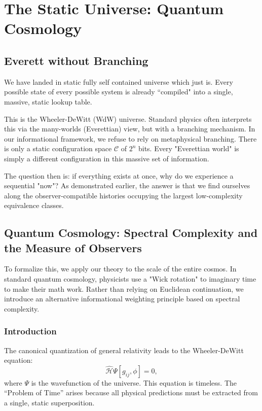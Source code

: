 \chapter{The Static Universe: Quantum Cosmology}
\label{chap:wdw}

\section{Everett without Branching}

We have landed in static fully self contained universe which just is. Every possible state of every possible system is already ``compiled" into a single, massive, static lookup table.

This is the Wheeler-DeWitt (WdW) universe. Standard physics often interprets this via the many-worlds (Everettian) view, but with a branching mechanism.
In our informational framework, we refuse to rely on metaphysical branching. There is only a static configuration space $\mathcal{C}$ of $2^n$ bits. Every "Everettian world" is simply a different
configuration in this massive set of information.

The question then is: if everything exists at once, why do we experience a sequential "now"?
As demonstrated earlier, the answer is that we find ourselves along the observer-compatible histories occupying the largest low-complexity equivalence classes.


\section{Quantum Cosmology: Spectral Complexity and the Measure of Observers}

To formalize this, we apply our theory to the scale of the entire cosmos.
In standard quantum cosmology, physicists use a "Wick rotation" to imaginary time to make their math work. 
Rather than relying on Euclidean continuation, we introduce an alternative informational weighting principle based on spectral complexity.


\subsection*{Introduction}

The canonical quantization of general relativity leads to the Wheeler-DeWitt equation:
\begin{equation}
\hat{\mathcal{H}} \Psi[g_{ij}, \phi] = 0,
\end{equation}
where $\Psi$ is the wavefunction of the universe. This equation is timeless. The ``Problem of Time'' arises because all physical predictions must be extracted from a single, static superposition.

